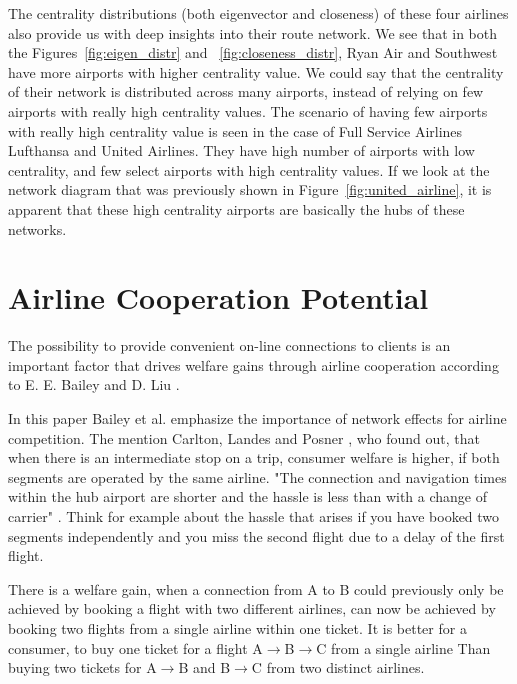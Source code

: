 \documentclass[twocolumn]{tum-article}
\begin{document}
The centrality distributions (both eigenvector and closeness) of these four airlines also provide us with deep insights into their route network. 
We see that in both the Figures~\ref{fig:eigen_distr} and ~\ref{fig:closeness_distr}, Ryan Air and Southwest have more airports with higher centrality value.
We could say that the centrality of their network is distributed across many airports, instead of relying on few airports with really high centrality values. 
The scenario of having few airports with really high centrality value is seen in the case of Full Service Airlines Lufthansa and United Airlines. They have high number of airports with low centrality, and few select airports with high centrality values.
If we look at the network diagram that was previously shown in Figure~\ref{fig:united_airline}, it is apparent that these high centrality airports are basically the hubs of these networks.  

\section{Airline Cooperation Potential}

The possibility to provide convenient on-line connections to clients is an important factor that drives welfare gains through airline cooperation according to E. E. Bailey and D. Liu \cite{airline_consolidation_and_consumer_welfare}.

In this paper Bailey et al. emphasize the importance of network effects for airline competition. The mention Carlton, Landes and Posner \cite{costs-and-benefits-of-airline-mergers}, who found out, that when there is an intermediate stop on a trip, consumer welfare is higher, if both segments are operated by the same airline. 
"The connection and navigation times within the hub airport are shorter and the hassle is less than with a change of carrier" \cite{airline_consolidation_and_consumer_welfare}. 
Think for example about the hassle that arises if you have booked two segments independently and you miss the second flight due to a delay of the first flight. 

There is a welfare gain, when a connection from A to B could previously only be achieved by booking a flight with two different airlines, can now be achieved by booking two flights from a single airline within one ticket. 
It is better for a consumer, to buy one ticket for a flight \mbox{A$\rightarrow$B$\rightarrow$C} from a single airline 
Than buying two tickets for \mbox{A$\rightarrow$B} and \mbox{B$\rightarrow$C} from two distinct airlines.
\end{document}
